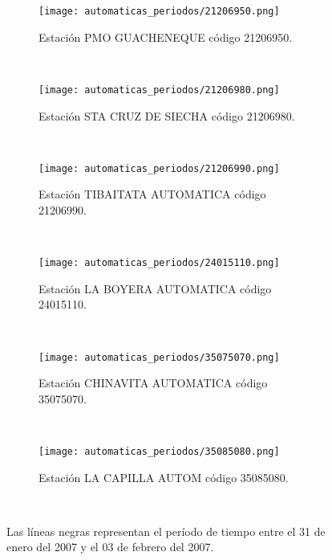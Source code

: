 \begin{figure}[H]\ContinuedFloat
\centering 
\begin{subfigure}[normla]{0.4\textwidth}
\texttt{[image: automaticas\_periodos/21206950.png]}
\caption{Estación PMO GUACHENEQUE código 21206950.}
\end{subfigure}
~
\begin{subfigure}[normla]{0.4\textwidth}
\texttt{[image: automaticas\_periodos/21206980.png]}
\caption{Estación STA CRUZ DE SIECHA código 21206980.}
\end{subfigure}
~

\begin{subfigure}[normla]{0.4\textwidth}
\texttt{[image: automaticas\_periodos/21206990.png]}
\caption{Estación TIBAITATA AUTOMATICA código 21206990.}
\end{subfigure}
~
\begin{subfigure}[normla]{0.4\textwidth}
\texttt{[image: automaticas\_periodos/24015110.png]}
\caption{Estación LA BOYERA AUTOMATICA código 24015110.}
\end{subfigure}
~

\begin{subfigure}[normla]{0.4\textwidth}
\texttt{[image: automaticas\_periodos/35075070.png]}
\caption{Estación CHINAVITA AUTOMATICA código 35075070.}
\end{subfigure}
~
\begin{subfigure}[normla]{0.4\textwidth}
\texttt{[image: automaticas\_periodos/35085080.png]}
\caption{Estación LA CAPILLA AUTOM código 35085080.}
\end{subfigure}
~




\caption{Las líneas negras representan el período de tiempo entre el 31 de enero del 2007 y el 03 de febrero del 2007.}
\end{figure}
